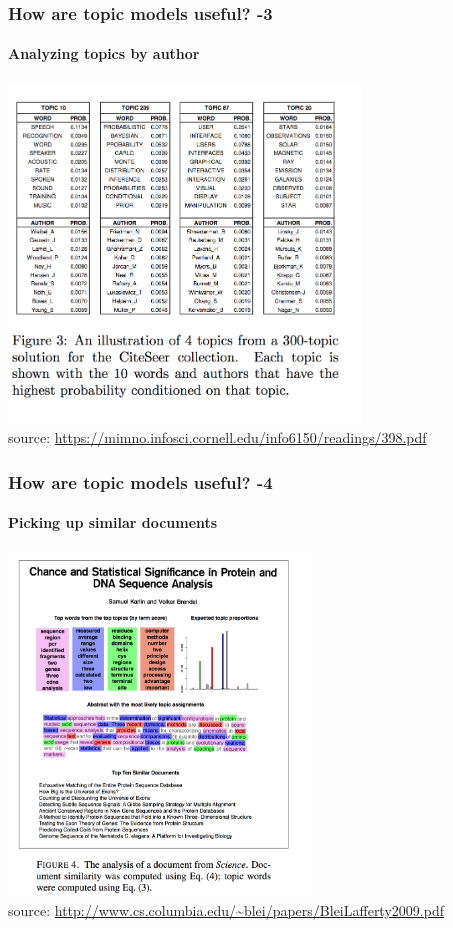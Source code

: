 \documentclass{beamer}
\begin{document}
\begin{frame}
\frametitle{How are topic models useful?  -3}
\framesubtitle{Analyzing topics by author}
\includegraphics[width=0.7\textwidth]{topicmodels3.png}
\footnotesize \\ source: \url{https://mimno.infosci.cornell.edu/info6150/readings/398.pdf}
\end{frame}

\begin{frame}
\frametitle{How are topic models useful?  -4}
\framesubtitle{Picking up similar documents}
\includegraphics[width=0.6\textwidth]{topicmodels5.png}
\footnotesize \\ source: \url{http://www.cs.columbia.edu/~blei/papers/BleiLafferty2009.pdf}
\end{frame}
\end{document}
